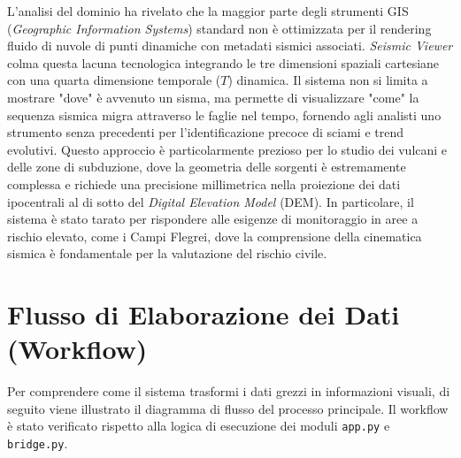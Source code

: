 \documentclass[12pt,a4paper]{article}
\begin{document}
L'analisi del dominio ha rivelato che la maggior parte degli strumenti GIS (\textit{Geographic Information Systems}) standard non è ottimizzata per il rendering fluido di nuvole di punti dinamiche con metadati sismici associati. \textit{Seismic Viewer} colma questa lacuna tecnologica integrando le tre dimensioni spaziali cartesiane con una quarta dimensione temporale ($T$) dinamica. Il sistema non si limita a mostrare "dove" è avvenuto un sisma, ma permette di visualizzare "come" la sequenza sismica migra attraverso le faglie nel tempo, fornendo agli analisti uno strumento senza precedenti per l'identificazione precoce di sciami e trend evolutivi. Questo approccio è particolarmente prezioso per lo studio dei vulcani e delle zone di subduzione, dove la geometria delle sorgenti è estremamente complessa e richiede una precisione millimetrica nella proiezione dei dati ipocentrali al di sotto del \textit{Digital Elevation Model} (DEM). In particolare, il sistema è stato tarato per rispondere alle esigenze di monitoraggio in aree a rischio elevato, come i Campi Flegrei, dove la comprensione della cinematica sismica è fondamentale per la valutazione del rischio civile.

\section{Flusso di Elaborazione dei Dati (Workflow)}
Per comprendere come il sistema trasformi i dati grezzi in informazioni visuali, di seguito viene illustrato il diagramma di flusso del processo principale. Il workflow è stato verificato rispetto alla logica di esecuzione dei moduli \texttt{app.py} e \texttt{bridge.py}.
\end{document}
